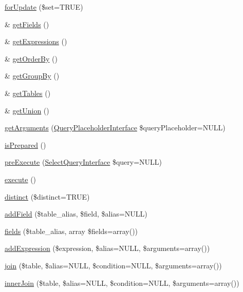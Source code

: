 \begin{DoxyCompactItemize}
\item 
\hyperlink{classSelectQuery_a44a1776379e738445712e196957e02b4}{forUpdate} (\$set=TRUE)
\item 
\& \hyperlink{classSelectQuery_aa9b27e2c4eb533ba25af4ca37ca3554f}{getFields} ()
\item 
\& \hyperlink{classSelectQuery_a179b46ba9871979ab9aeb1c5f1735e89}{getExpressions} ()
\item 
\& \hyperlink{classSelectQuery_ae8b6b2087ed35d84111bd38e5309ccf6}{getOrderBy} ()
\item 
\& \hyperlink{classSelectQuery_ace0f2e44a175344b8d8c760d70b48596}{getGroupBy} ()
\item 
\& \hyperlink{classSelectQuery_a42ce5a7a4a01a341231b005f32811ee6}{getTables} ()
\item 
\& \hyperlink{classSelectQuery_a340167ba07c99ab15c39c632f73d1d3b}{getUnion} ()
\item 
\hyperlink{classSelectQuery_a178ae347a7c736ac39fb5a25fb8b3783}{getArguments} (\hyperlink{interfaceQueryPlaceholderInterface}{QueryPlaceholderInterface} \$queryPlaceholder=NULL)
\item 
\hyperlink{classSelectQuery_a12d7cb534e4178f404286468f4ad3321}{isPrepared} ()
\item 
\hyperlink{classSelectQuery_a2b848ae6bd4c4e2059247a03b7ab6375}{preExecute} (\hyperlink{interfaceSelectQueryInterface}{SelectQueryInterface} \$query=NULL)
\item 
\hyperlink{classSelectQuery_a06e4212057c140773970e3c34b0b696d}{execute} ()
\item 
\hyperlink{classSelectQuery_a9d76d503d9769768f5d20cf1793c670b}{distinct} (\$distinct=TRUE)
\item 
\hyperlink{classSelectQuery_a8f5cef012b0f3111a5e6b8bcc47bacea}{addField} (\$table\_\-alias, \$field, \$alias=NULL)
\item 
\hyperlink{classSelectQuery_ab240a4ee46566adaff68b364c7c60699}{fields} (\$table\_\-alias, array \$fields=array())
\item 
\hyperlink{classSelectQuery_a8d99c03f6dea06e698640cf77c0a1d21}{addExpression} (\$expression, \$alias=NULL, \$arguments=array())
\item 
\hyperlink{classSelectQuery_aceff7fc4040a74f693f2fc2548a99c17}{join} (\$table, \$alias=NULL, \$condition=NULL, \$arguments=array())
\item 
\hyperlink{classSelectQuery_a2e3bad44c2eca1e74130622a93fdc394}{innerJoin} (\$table, \$alias=NULL, \$condition=NULL, \$arguments=array())
\item 

\end{DoxyCompactItemize}
